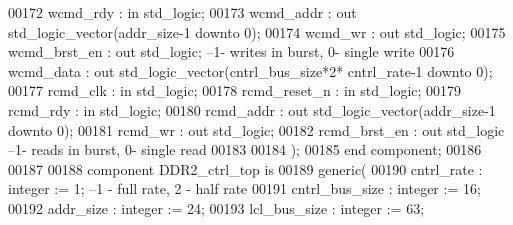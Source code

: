 \begin{DoxyCode}
00172         wcmd_rdy                    : \textcolor{keywordflow}{in} \textcolor{comment}{std\_logic};
00173         wcmd_addr               : \textcolor{keywordflow}{out} \textcolor{comment}{std\_logic\_vector}(addr_size\textcolor{vhdlchar}{-}\textcolor{vhdllogic}{}\textcolor{vhdllogic}{1} \textcolor{keywordflow}{downto} \textcolor{vhdllogic}{}\textcolor{vhdllogic}{0});
00174         wcmd_wr                 : \textcolor{keywordflow}{out} \textcolor{comment}{std\_logic};
00175         wcmd_brst_en            : \textcolor{keywordflow}{out} \textcolor{comment}{std\_logic}; \textcolor{keyword}{--1- writes in burst, 0- single write}
00176         wcmd_data               : \textcolor{keywordflow}{out} \textcolor{comment}{std\_logic\_vector}(cntrl_bus_size*\textcolor{vhdllogic}{}\textcolor{vhdllogic}{2}*
      cntrl_rate\textcolor{vhdlchar}{-}\textcolor{vhdllogic}{}\textcolor{vhdllogic}{1} \textcolor{keywordflow}{downto} \textcolor{vhdllogic}{}\textcolor{vhdllogic}{0});
00177         rcmd_clk                    : \textcolor{keywordflow}{in} \textcolor{comment}{std\_logic};
00178         rcmd_reset_n            : \textcolor{keywordflow}{in} \textcolor{comment}{std\_logic};
00179         rcmd_rdy                    : \textcolor{keywordflow}{in} \textcolor{comment}{std\_logic};
00180         rcmd_addr               : \textcolor{keywordflow}{out} \textcolor{comment}{std\_logic\_vector}(addr_size\textcolor{vhdlchar}{-}\textcolor{vhdllogic}{}\textcolor{vhdllogic}{1} \textcolor{keywordflow}{downto} \textcolor{vhdllogic}{}\textcolor{vhdllogic}{0});
00181         rcmd_wr                 : \textcolor{keywordflow}{out} \textcolor{comment}{std\_logic};
00182         rcmd_brst_en            : \textcolor{keywordflow}{out} \textcolor{comment}{std\_logic}\textcolor{keyword}{ --1- reads in burst, 0- single read}
00183         
00184         );
00185 \textcolor{keywordflow}{end} \textcolor{keywordflow}{component};
00186 
00187 
00188 \textcolor{keywordflow}{component} DDR2_ctrl_top \textcolor{keywordflow}{is}
00189         \textcolor{keywordflow}{generic}(
00190             cntrl_rate          : \textcolor{comment}{integer} := \textcolor{vhdllogic}{}\textcolor{vhdllogic}{1}; \textcolor{keyword}{--1 - full rate, 2 - half rate}
00191             cntrl_bus_size      : \textcolor{comment}{integer} := \textcolor{vhdllogic}{}\textcolor{vhdllogic}{16};
00192             addr_size           : \textcolor{comment}{integer} := \textcolor{vhdllogic}{}\textcolor{vhdllogic}{24};
00193             lcl_bus_size        : \textcolor{comment}{integer} := \textcolor{vhdllogic}{}\textcolor{vhdllogic}{63};

\end{DoxyCode}
